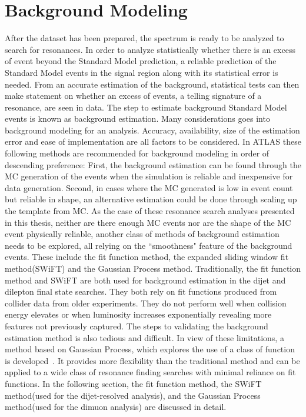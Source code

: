 \section{Background Modeling}
\label{sec:backgroundest}
After the dataset has been prepared, the spectrum is ready to be analyzed to search for resonances. In order to analyze statistically whether there is an excess of event beyond the Standard Model prediction, a reliable prediction of the Standard Model events in the signal region along with its statistical error is needed. From an accurate estimation of the background, statistical tests can then make statement on whether an excess of events, a telling signature of a resonance, are seen in data.
The step to estimate background Standard Model events is known as background estimation.
    Many considerations goes into background modeling for an analysis. Accuracy, availability, size of the estimation error and ease of implementation are all factors to be considered. In ATLAS these following methods are recommended for background modeling in order of descending preference:
    First, the background estimation can be found through the MC generation of the events when the simulation is reliable and inexpensive for data generation. Second, in cases where the MC generated is low in event count but reliable in shape, an alternative estimation could be done through scaling up the template from MC. As the case of these resonance search analyses presented in this thesis, neither are there enough MC events nor are the shape of the MC event physically reliable, another class of methods of background estimation needs to be explored, all relying on the ``smoothness" feature of the background events. These include the fit function method, the expanded sliding window fit method(SWiFT) and the Gaussian Process method.
    Traditionally, the fit function method and SWiFT are both used for background estimation in the dijet and dilepton final state searches. They both rely on fit functions produced from collider data from older experiments. They do not perform well when collision energy elevates or when luminosity increases exponentially revealing more features not previously captured. The steps to validating the background estimation method is also tedious and difficult.
    In view of these limitations, a method based on Gaussian Process, which explores the use of a class of function is developed~\cite{frate2017modeling}. It provides more flexibility than the traditional method and can be applied to a wide class of resonance finding searches with minimal reliance on fit functions. 
    In the following section, the fit function method, the SWiFT method(used for the dijet-resolved analysis), and the Gaussian Process method(used for the dimuon analysis) are discussed in detail. 

